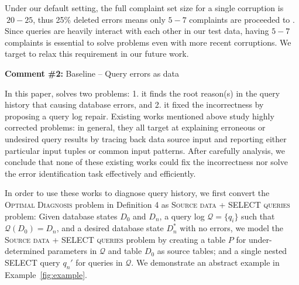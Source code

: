 Under our default setting, the full complaint set size for a single corruption is $~20-25$, thus 
25\% deleted errors means only $5-7$ complaints are proceeded to \sys. Since queries
are heavily interact with each other in our test data, having $5-7$ complaints is essential 
to solve problems even with more recent corruptions. 
We target to relax this requirement in our future work.



\comskip

\noindent
\textbf{Comment \#2:} Baseline -- Query errors as data
\begin{quote}
\end{quote}


In this paper, \sys solves two problems: 1. it finds the root reason(s) in the
query history that causing database errors, and 2. it fixed the incorrectness
by proposing a query log repair. Existing works mentioned above study highly
corrected problems: in general, they all target at explaining erroneous or
undesired query results by tracing back data source input and reporting either
particular input tuples or common input patterns. After carefully analysis, we
conclude that none of these existing works could fix the incorrectness nor
solve the error identification task effectively and efficiently.

In order to use these works to diagnose query history, we first convert the
\textsc{Optimal Diagnosis} problem in Definition 4 as \textsc{Source data +
SELECT queries} problem: Given database states $D_0$ and $D_n$, a query log
$\mathcal{Q} = \{q_i\}$ such that $\mathcal{Q}(D_0) = D_n$, and a desired
database state $D_n^*$ with no errors, we model the \textsc{Source data +
SELECT queries} problem by creating a table $P$ for under-determined
parameters in $\mathcal{Q}$ and table $D_0$ as source tables; and a single
nested SELECT query $q_n'$ for queries in $\mathcal{Q}$. We demonstrate an
abstract example in Example~\ref{fig:example}.

